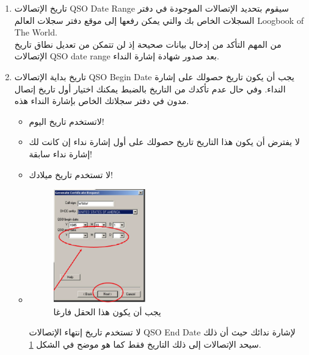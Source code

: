 \documentclass[a4paper,12pt]{article}
\begin{document}
\begin{enumerate}
		\begin{itemize}
			
			\item
				    عنوانك في الـ \textenglish{FCC}\footnote{\textenglish{FCC}: هي هيئة الإتصالات الفدرالية في أمريكا.} كان ولاية هاواي أو ألاسكا فإن الـ \textenglish{DXCC entity}\footnote{\textenglish{DXCC entity}: تعني كيانك أو موقعك الجغرافي حسب تقسيم \textenglish{DXCC} وهي اختصار لـ \textenglish{DX Century Club} أي نادي القرن للمحطات البعيدة.} الخاص بك سيكون هاواي أو ألاسكا.
			\item
				لو كان عنوانك في الـ \textenglish{FCC} هو إحدى الولايات الأمريكية فإن الـ \textenglish{DXCC entity} الخاص بك سيكون الولايات المتحدة الأمريكية.
		\end{itemize}

			\item
			 تاريخ الإتصالات \textenglish{QSO Date Range} سيقوم بتحديد الإتصالات الموجودة في دفتر السجلات الخاص بك والتي يمكن رفعها إلى موقع دفتر سجلات العالم \textenglish{Loogbook of The World}.
			\\
			من المهم التأكد من إدخال بيانات صحيحة إذ لن تتمكن من تعديل نطاق تاريخ
			الإتصالات \textenglish{QSO date range} بعد صدور شهادة إشارة النداء.

			\item
				  تاريخ بداية الإتصالات \textenglish{QSO Begin Date} يجب أن يكون تاريخ حصولك على إشارة النداء. وفي حال عدم تأكدك من التاريخ بالضبط يمكنك اختيار أول تاريخ إتصال مدون في دفتر سجلاتك الخاص بإشارة النداء هذه.
				\begin{itemize}
					\item
						لاتستخدم تاريخ اليوم!
					\item
						لا يفترض أن يكون هذا التاريخ تاريخ حصولك على أول إشارة نداء إن كانت لك إشارة نداء سابقة!
					\item
						لا تستخدم تاريخ ميلادك!
				\clearpage
					\item
						\begin{figure}[!hbtp]
						\centering
						\includegraphics[width=0.4\textwidth]{csrenddate.eps}
						\caption{يجب أن يكون هذا الحقل فارغا}
						\label{fig:CSR End Date}
						\end{figure}
						لا تستخدم تاريخ إنتهاء الإتصالات \textenglish{QSO End Date} لإشارة ندائك حيث
						أن ذلك سيحد الإتصالات إلى ذلك التاريخ فقط كما هو موضح في الشكل \ref{fig:CSR End Date}.


\end{itemize}
\end{enumerate}
\end{document}
